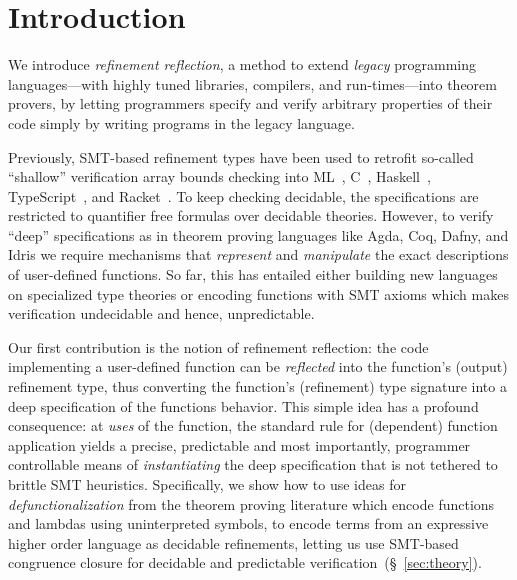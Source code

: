 \section{Introduction}\label{sec:intro}

We introduce \emph{refinement reflection}, a method
to extend \emph{legacy} programming languages---with highly tuned
libraries, compilers, and run-times---into theorem provers,
by letting programmers specify and verify
arbitrary properties of their code simply
by writing programs in the legacy language.

Previously, SMT-based refinement types
\citep{ConstableS87,Rushby98} have been
used to retrofit so-called ``shallow''
verification \eg array bounds checking into
%
ML~\cite{pfenningxi98,GordonRefinement09,LiquidPLDI08},
%
C~\cite{deputy,LiquidPOPL10},
%
Haskell~\citep{Vazou14},
%
TypeScript~\cite{Vekris16}, and
%
Racket~\cite{RefinedRacket}.
%
%
To keep checking decidable, the specifications
are restricted to quantifier free formulas over
decidable theories.
%
However, to verify ``deep'' specifications as
in theorem proving languages like Agda, Coq, Dafny,
\fstar and Idris we require mechanisms that
\emph{represent} and \emph{manipulate} the
exact descriptions of user-defined functions.
%
So far, this has entailed either building new
languages on specialized type theories or
encoding functions with SMT axioms which makes
verification undecidable and hence, unpredictable.

%
%
Our first contribution is the notion of
refinement reflection: the code
implementing a user-defined function can
be \emph{reflected} into the function's
(output) refinement type, thus converting
the function's (refinement) type signature
into a deep specification of the functions
behavior.
%
This simple idea has a profound consequence:
at \emph{uses} of the function, the standard
rule for (dependent) function application
yields a precise, predictable and most
importantly, programmer controllable
means of \emph{instantiating} the deep
specification that is not tethered to
brittle SMT heuristics.
%
Specifically, we show how to use ideas for
\emph{defunctionalization} from the theorem
proving literature which encode functions
and lambdas using uninterpreted symbols,
to encode terms from an expressive higher
order language as decidable refinements,
letting us use SMT-based congruence
closure for decidable and predictable
verification~(\S~\ref{sec:theory}).

